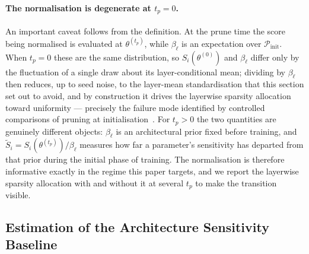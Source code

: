 \documentclass{article}
\theoremstyle{definition}
\theoremstyle{remark}
\begin{document}
\paragraph{The normalisation is degenerate at $t_p=0$.} An important caveat
follows from the definition. At the prune time the score being normalised is
evaluated at $\theta^{(t_p)}$, while $\beta_\ell$ is an expectation over
$\mathcal P_{\mathrm{init}}$. When $t_p=0$ these are the same distribution, so
$S_i(\theta^{(0)})$ and $\beta_\ell$ differ only by the fluctuation of a single
draw about its layer-conditional mean; dividing by $\beta_\ell$ then reduces, up
to seed noise, to the layer-mean standardisation that this section set out to
avoid, and by construction it drives the layerwise sparsity allocation toward
uniformity --- precisely the failure mode identified by controlled comparisons of
pruning at initialisation~\cite{frankle2021missing, su2020sanity}. For $t_p>0$
the two quantities are genuinely different objects: $\beta_\ell$ is an
architectural prior fixed before training, and
$\widetilde S_i=S_i(\theta^{(t_p)})/\beta_\ell$ measures how far a parameter's
sensitivity has departed from that prior during the initial phase of training.
The normalisation is therefore informative exactly in the regime this paper
targets, and we report the layerwise sparsity allocation with and without it at
several $t_p$ to make the transition visible.

\subsection{Estimation of the Architecture Sensitivity Baseline}
\end{document}
